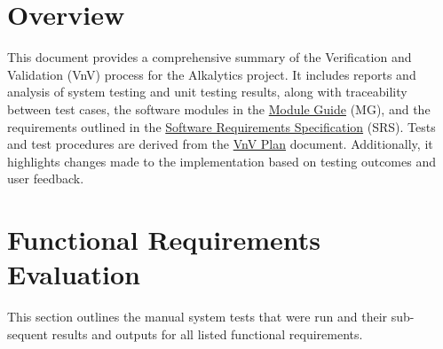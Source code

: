 \documentclass[12pt, titlepage]{article}
\begin{document}
\newpage

\tableofcontents

\listoftables %

\newpage


\section{Overview}
This document provides a comprehensive summary of the Verification and
Validation (VnV) process for the Alkalytics project. It includes reports and
analysis of system testing and unit testing results, along with traceability
between test cases, the software modules in the
\href{https://github.com/SumanyaG/Alkalytics/blob/main/docs/Design/MG.pdf}{Module
Guide} (MG), and the requirements outlined in the
\href{https://github.com/SumanyaG/Alkalytics/blob/main/docs/SRS/SRS.pdf}{Software
Requirements Specification} (SRS). Tests and test procedures are derived from
the
\href{https://github.com/SumanyaG/Alkalytics/blob/main/docs/VnVPlan/VnVPlan.pdf}{VnV
Plan} document. Additionally, it highlights changes made to the implementation
based on testing outcomes and user feedback.

\section{Functional Requirements Evaluation}
This section outlines the manual system tests that were run and their sub-
sequent results and outputs for all listed functional requirements.
\end{document}
